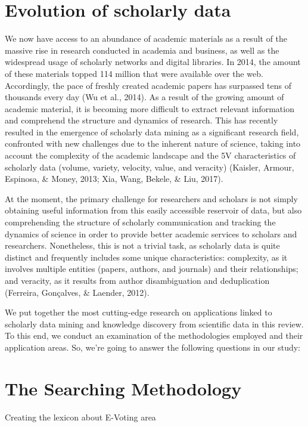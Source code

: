 \documentclass{article}
\begin{document}
\section{Evolution of scholarly data}
We now have access to an abundance of academic materials as a result of the massive rise in research conducted in academia and business, as well as the widespread usage of scholarly networks and digital libraries.
In 2014, the amount of these materials topped 114 million that were available over the web.
Accordingly, the pace of freshly created academic papers has surpassed tens of thousands every day (Wu et al., 2014).
As a result of the growing amount of academic material, it is becoming more difficult to extract relevant information and comprehend the structure and dynamics of research.
This has recently resulted in the emergence of scholarly data mining as a significant research field, confronted with new challenges due to the inherent nature of science, taking into account the complexity of the academic landscape and the 5V characteristics of scholarly data (volume, variety, velocity, value, and veracity) (Kaisler, Armour, Espinosa, & Money, 2013; Xia, Wang, Bekele, & Liu, 2017). 


At the moment, the primary challenge for researchers and scholars is not simply obtaining useful information from this easily accessible reservoir of data, but also comprehending the structure of scholarly communication and tracking the dynamics of science in order to provide better academic services to scholars and researchers.
Nonetheless, this is not a trivial task, as scholarly data is quite distinct and frequently includes some unique characteristics: complexity, as it involves multiple entities (papers, authors, and journals) and their relationships; and veracity, as it results from author disambiguation and deduplication (Ferreira, Gonçalves, & Laender, 2012). 


We put together the most cutting-edge research on applications linked to scholarly data mining and knowledge discovery from scientific data in this review.
To this end, we conduct an examination of the methodologies employed and their application areas.
So, we're going to answer the following questions in our study: 


\section{The Searching Methodology }
Creating the lexicon about E-Voting area 
\end{document}
